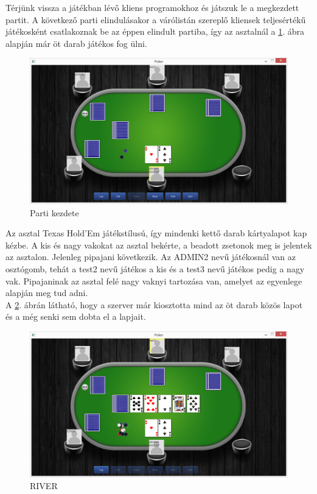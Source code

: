 Térjünk vissza a játékban lévő kliens programokhoz és játszuk le a megkezdett partit. A következő parti elindulásakor a várólistán szereplő kliensek teljesértékű játékosként csatlakoznak be az éppen elindult partiba, így az asztalnál a \ref{fig:parti_2}. ábra alapján már öt darab játékos fog ülni.
 \begin{figure}[h!]
  \caption{Parti kezdete}
  \label{fig:parti_2}
  \centering
    \includegraphics[width=\textwidth]{user-documentation/images/parti/parti_2.jpg}
\end{figure}
Az asztal Texas Hold'Em játékstílusú, így mindenki kettő darab kártyalapot kap kézbe. A kis és nagy vakokat az asztal bekérte, a beadott zsetonok meg is jelentek az asztalon. Jelenleg pipajani következik. Az ADMIN2 nevű játékosnál van az osztógomb, tehát a test2 nevű játékos a kis és a test3 nevű játékos pedig a nagy vak. Pipajaninak az asztal felé nagy vaknyi tartozása van, amelyet az egyenlege alapján meg tud adni. \\
A \ref{fig:parti_3}. ábrán látható, hogy a szerver már kiosztotta mind az öt darab közös lapot és a még senki sem dobta el a lapjait.
 \begin{figure}[h!]
  \caption{RIVER}
  \label{fig:parti_3}
  \centering
    \includegraphics[width=\textwidth]{user-documentation/images/parti/parti_3.jpg}
\end{figure}
